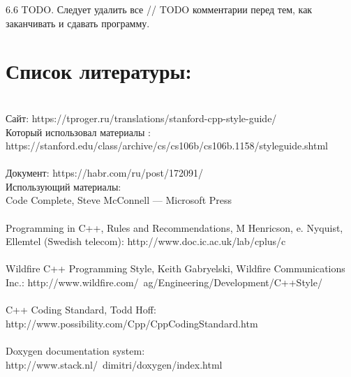 \documentclass{article}
\begin{document}
6.6 TODO. Следует удалить все // TODO комментарии перед тем, как заканчивать и сдавать программу.

\newpage
\section{Список литературы:}
\\
Сайт: https://tproger.ru/translations/stanford-cpp-style-guide/\\
Который использовал материалы :\\ https://stanford.edu/class/archive/cs/cs106b/cs106b.1158/styleguide.shtml\\
\\
Документ: https://habr.com/ru/post/172091/\\
Использующий материалы:\\
Code Complete, Steve McConnell — Microsoft Press
\\\\
Programming in C++, Rules and Recommendations, M Henricson, e. Nyquist, Ellemtel (Swedish telecom): http://www.doc.ic.ac.uk/lab/cplus/c%
\\\\
Wildfire C++ Programming Style, Keith Gabryelski, Wildfire Communications Inc.: http://www.wildfire.com/~ag/Engineering/Development/C++Style/
\\\\
C++ Coding Standard, Todd Hoff: http://www.possibility.com/Cpp/CppCodingStandard.htm
\\\\
Doxygen documentation system: http://www.stack.nl/~dimitri/doxygen/index.html
\end{document}
